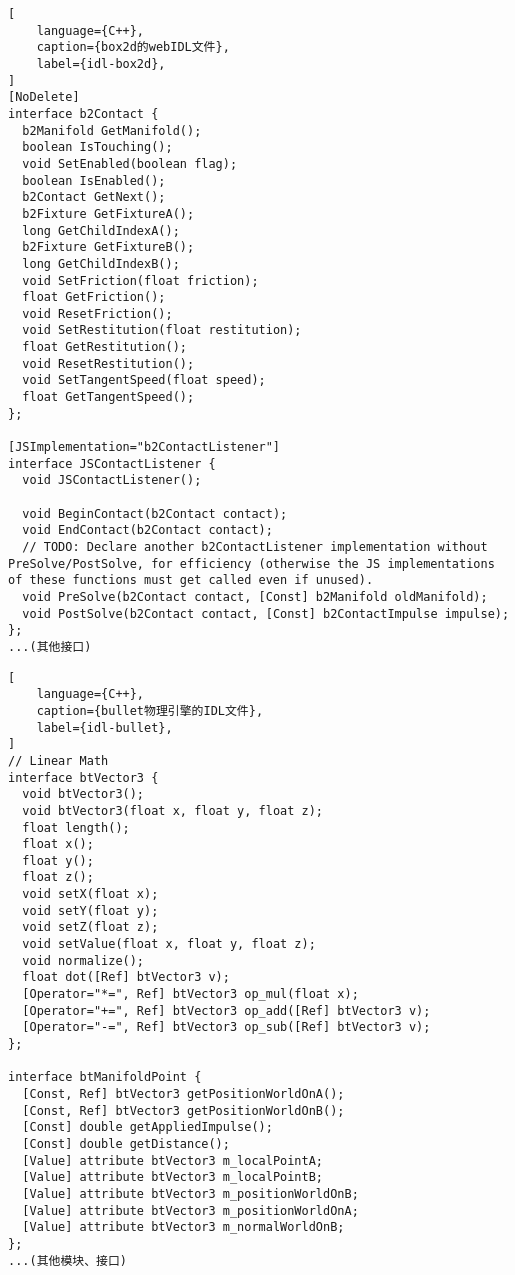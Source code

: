 \newpage

\begin{lstlisting}[
    language={C++},
    caption={box2d的webIDL文件},
    label={idl-box2d},
]
[NoDelete]
interface b2Contact {
  b2Manifold GetManifold();
  boolean IsTouching();
  void SetEnabled(boolean flag);
  boolean IsEnabled();
  b2Contact GetNext();
  b2Fixture GetFixtureA();
  long GetChildIndexA();
  b2Fixture GetFixtureB();
  long GetChildIndexB();
  void SetFriction(float friction);
  float GetFriction();
  void ResetFriction();
  void SetRestitution(float restitution);
  float GetRestitution();
  void ResetRestitution();
  void SetTangentSpeed(float speed);
  float GetTangentSpeed();
};

[JSImplementation="b2ContactListener"]
interface JSContactListener {
  void JSContactListener();

  void BeginContact(b2Contact contact);
  void EndContact(b2Contact contact);
  // TODO: Declare another b2ContactListener implementation without PreSolve/PostSolve, for efficiency (otherwise the JS implementations of these functions must get called even if unused).
  void PreSolve(b2Contact contact, [Const] b2Manifold oldManifold);
  void PostSolve(b2Contact contact, [Const] b2ContactImpulse impulse);
};
...(其他接口)

\end{lstlisting}

\newpage

\begin{lstlisting}[
    language={C++},
    caption={bullet物理引擎的IDL文件},
    label={idl-bullet},
]
// Linear Math
interface btVector3 {
  void btVector3();
  void btVector3(float x, float y, float z);
  float length();
  float x();
  float y();
  float z();
  void setX(float x);
  void setY(float y);
  void setZ(float z);
  void setValue(float x, float y, float z);
  void normalize();
  float dot([Ref] btVector3 v);
  [Operator="*=", Ref] btVector3 op_mul(float x);
  [Operator="+=", Ref] btVector3 op_add([Ref] btVector3 v);
  [Operator="-=", Ref] btVector3 op_sub([Ref] btVector3 v);
};

interface btManifoldPoint {
  [Const, Ref] btVector3 getPositionWorldOnA();
  [Const, Ref] btVector3 getPositionWorldOnB();
  [Const] double getAppliedImpulse();
  [Const] double getDistance();
  [Value] attribute btVector3 m_localPointA;
  [Value] attribute btVector3 m_localPointB;
  [Value] attribute btVector3 m_positionWorldOnB;
  [Value] attribute btVector3 m_positionWorldOnA;
  [Value] attribute btVector3 m_normalWorldOnB;
};
...(其他模块、接口)

\end{lstlisting}

